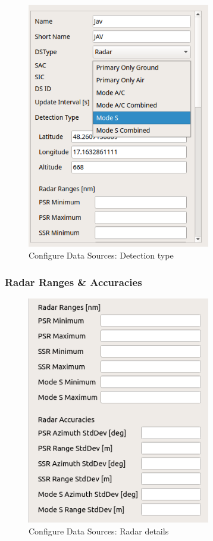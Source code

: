 \begin{figure}[H]
  \center
    \includegraphics[width=8cm,frame]{figures/configure_ds_dettyp.png}
  \caption{Configure Data Sources: Detection type}
\end{figure}

\subsubsection{Radar Ranges \& Accuracies}

\begin{figure}[H]
  \center
    \includegraphics[width=8cm,frame]{figures/configure_data_sources_radar_details.png}
  \caption{Configure Data Sources: Radar details}
\end{figure}

